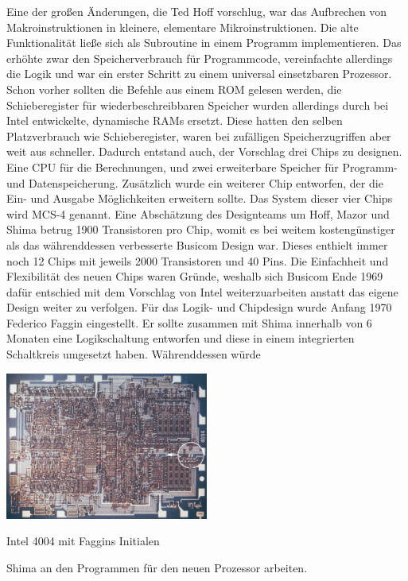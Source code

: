 Eine der großen Änderungen, die Ted Hoff vorschlug, war das Aufbrechen von Makroinstruktionen in kleinere, elementare Mikroinstruktionen. Die alte Funktionalität ließe sich als Subroutine in einem Programm implementieren. Das erhöhte zwar den Speicherverbrauch für Programmcode,
vereinfachte allerdings die Logik und war ein erster Schritt zu einem universal einsetzbaren Prozessor. Schon vorher sollten die Befehle aus einem ROM gelesen werden, die Schieberegister für wiederbeschreibbaren Speicher wurden allerdings durch bei Intel entwickelte, dynamische RAMs ersetzt. Diese hatten den selben Platzverbrauch wie Schieberegister, waren bei zufälligen Speicherzugriffen aber weit aus schneller. Dadurch entstand auch, der Vorschlag drei Chips zu designen. Eine CPU für die Berechnungen, und zwei erweiterbare Speicher für Programm- und Datenspeicherung. Zusätzlich wurde ein weiterer Chip entworfen, der die Ein- und Ausgabe Möglichkeiten erweitern sollte. Das System dieser vier Chips wird MCS-4 genannt.
Eine Abschätzung des Designteams um Hoff, Mazor und Shima betrug 1900 Transistoren pro Chip, womit es bei weitem kostengünstiger als das währenddessen verbesserte Busicom Design war.
Dieses enthielt immer noch 12 Chips mit jeweils 2000 Transistoren und 40 Pins.
Die Einfachheit und Flexibilität des neuen Chips waren Gründe, weshalb sich Busicom Ende 1969 dafür entschied mit dem Vorschlag von Intel weiterzuarbeiten anstatt das eigene Design weiter zu verfolgen. 
Für das Logik- und Chipdesign wurde Anfang 1970 Federico Faggin eingestellt. Er sollte zusammen mit Shima innerhalb von 6 Monaten eine Logikschaltung entworfen und diese in einem integrierten Schaltkreis umgesetzt haben. Währenddessen würde
 \newline
 \vspace{-24pt}
 \begin{floatingfigure}[l]{.5\textwidth}
 	\includegraphics[width=0.5\textwidth]{figures/circuit.jpg}
 	\caption{Intel 4004 mit Faggins Initialen}
 	\label{fig:circuit}
 \end{floatingfigure} 
Shima an den Programmen für den neuen Prozessor arbeiten.
